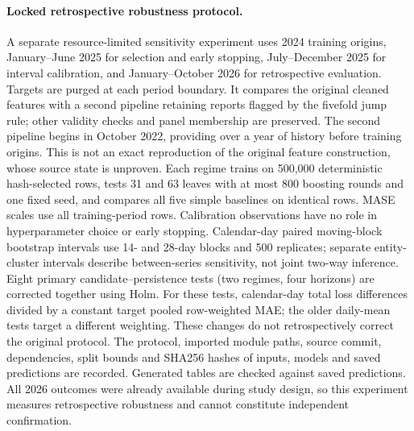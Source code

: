 \paragraph{Locked retrospective robustness protocol.}
A separate resource-limited sensitivity experiment uses 2024 training origins, January--June 2025 for selection and early stopping, July--December 2025 for interval calibration, and January--October 2026 for retrospective evaluation. Targets are purged at each period boundary. It compares the original cleaned features with a second pipeline retaining reports flagged by the fivefold jump rule; other validity checks and panel membership are preserved. The second pipeline begins in October 2022, providing over a year of history before training origins. This is not an exact reproduction of the original feature construction, whose source state is unproven.
Each regime trains on 500,000 deterministic hash-selected rows, tests 31 and 63 leaves with at most 800 boosting rounds and one fixed seed, and compares all five simple baselines on identical rows. MASE scales use all training-period rows. Calibration observations have no role in hyperparameter choice or early stopping. Calendar-day paired moving-block bootstrap intervals use 14- and 28-day blocks and 500 replicates; separate entity-cluster intervals describe between-series sensitivity, not joint two-way inference. Eight primary candidate--persistence tests (two regimes, four horizons) are corrected together using Holm. For these tests, calendar-day total loss differences divided by a constant target pooled row-weighted MAE; the older daily-mean tests target a different weighting. These changes do not retrospectively correct the original protocol.
The protocol, imported module paths, source commit, dependencies, split bounds and SHA256 hashes of inputs, models and saved predictions are recorded. Generated tables are checked against saved predictions. All 2026 outcomes were already available during study design, so this experiment measures retrospective robustness and cannot constitute independent confirmation.



